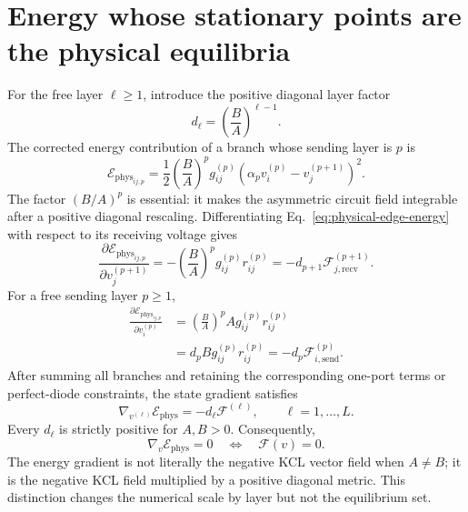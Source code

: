 \documentclass[11pt]{article}
\newcommand{\KCL}{\mathcal{F}}
\newcommand{\Ephys}{\mathcal{E}_{\mathrm{phys}}}
\begin{document}
\section{Energy whose stationary points are the physical equilibria}

For the free layer $\ell\geq1$, introduce the positive diagonal layer factor
\begin{equation}
  d_\ell=\left(\frac{B}{A}\right)^{\ell-1}.
  \label{eq:diagonal-factor}
\end{equation}
The corrected energy contribution of a branch whose sending layer is $p$ is
\begin{equation}
  \Ephys_{ij,p}
  =\frac{1}{2}\left(\frac{B}{A}\right)^p
   g_{ij}^{(p)}\left(\alpha_p v_i^{(p)}-v_j^{(p+1)}\right)^2.
  \label{eq:physical-edge-energy}
\end{equation}
The factor $(B/A)^p$ is essential: it makes the asymmetric circuit field
integrable after a positive diagonal rescaling.  Differentiating
Eq.~\eqref{eq:physical-edge-energy} with respect to its receiving voltage gives
\begin{equation}
  \frac{\partial \Ephys_{ij,p}}{\partial v_j^{(p+1)}}
  =-\left(\frac{B}{A}\right)^p g_{ij}^{(p)}r_{ij}^{(p)}
  =-d_{p+1}\KCL_{j,\mathrm{recv}}^{(p+1)}.
  \label{eq:recv-gradient}
\end{equation}
For a free sending layer $p\geq1$,
\begin{align}
  \frac{\partial \Ephys_{ij,p}}{\partial v_i^{(p)}}
  &=\left(\frac{B}{A}\right)^p A g_{ij}^{(p)}r_{ij}^{(p)} \\
  &=d_p B g_{ij}^{(p)}r_{ij}^{(p)}
   =-d_p\KCL_{i,\mathrm{send}}^{(p)}.
  \label{eq:send-gradient}
\end{align}
After summing all branches and retaining the corresponding one-port
terms or perfect-diode constraints, the state gradient satisfies
\begin{equation}
  \nabla_{v^{(\ell)}}\Ephys=-d_\ell\KCL^{(\ell)},
  \qquad \ell=1,\ldots,L.
  \label{eq:gradient-kcl}
\end{equation}
Every $d_\ell$ is strictly positive for $A,B>0$.  Consequently,
\begin{equation}
  \nabla_v\Ephys=0
  \quad\Longleftrightarrow\quad
  \KCL(v)=0.
  \label{eq:zeros-equivalent}
\end{equation}
The energy gradient is not literally the negative KCL vector field when
$A\neq B$; it is the negative KCL field multiplied by a positive diagonal
metric.  This distinction changes the numerical scale by layer but not the
equilibrium set.
\end{document}
